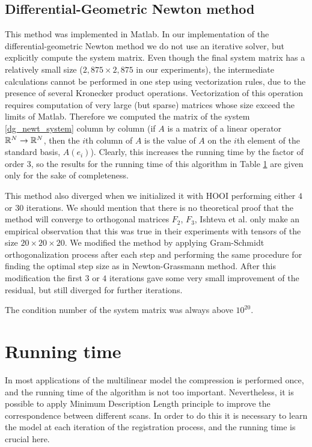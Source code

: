 \subsection{Differential-Geometric Newton method}
This method was implemented in Matlab.
In our implementation of the differential-geometric Newton method we
do not use an iterative solver, but explicitly compute the system
matrix. Even though
the final system matrix has a relatively small size ($2,875 \times 2,875$ in our
experiments), the intermediate calculations cannot be performed
in one step using vectorization rules,
due to the presence of several Kronecker product operations. 
Vectorization of this operation requires computation of very large (but sparse) matrices
whose size exceed the limits of Matlab. Therefore we computed the matrix of the system \eqref{dg_newt_system}
column by column (if $A$ is a matrix of a linear operator $\mathbb{R}^N \to \mathbb{R}^N$, then
the $i$th column of $A$ is the value of $A$ on the $i$th element of the standard
basis, $A(e_i)$). Clearly, this increases the running time by the factor of
order $3$, so the results for the running time of this algorithm in Table \ref{}
are given only for the sake of completeness.


This method also diverged when we initialized it with HOOI
performing either $4$ or $30$ iterations. We should mention
that there is no theoretical proof that the method
will converge to orthogonal matrices $F_2$, $F_3$, 
Ishteva et al. only make an empirical observation
that this was true in their experiments with tensors of the size $20 \times 20 \times 20$.
We modified the method by applying Gram-Schmidt orthogonalization process
after each step and performing
the same procedure for finding the optimal step size
as in Newton-Grassmann method. After this modification
the first $3$ or $4$ iterations
gave some very small improvement of the residual, but still diverged
for further iterations.


The condition number of the system matrix was always above $10^{20}$.

\section{Running time}

In most applications of the multilinear model the compression
is performed once, and the running time of the algorithm
is not too important. Nevertheless, it is possible to apply Minimum
Description Length principle to improve the correspondence between different
scans. In order to do this it is necessary to learn the model
at each iteration of the registration process, and the running
time is crucial here.


